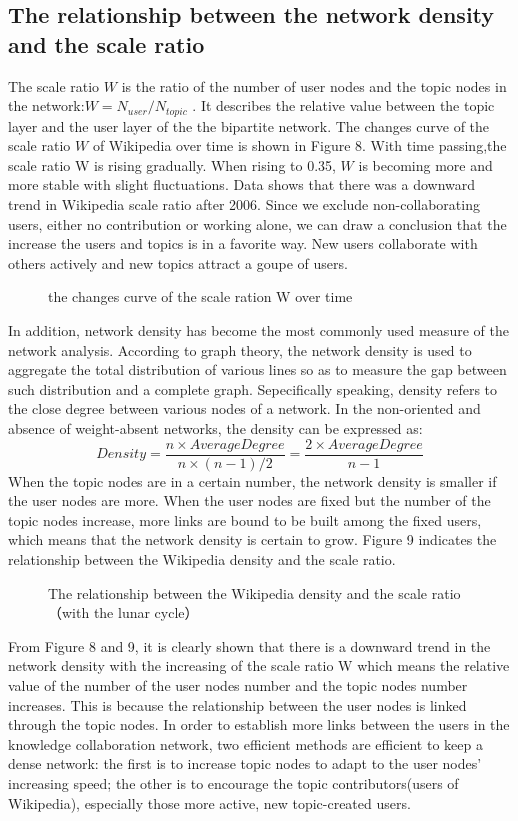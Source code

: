 \documentclass{elsarticle}
\begin{document}
\subsection{The relationship between the network density and the scale ratio}
\label{sec:relat-betw-netw}
 The scale
ratio $W$ is the ratio of the number of user nodes and the topic nodes in
the network:$W=N_{user}/N_{topic}$ . It describes the relative
value between the topic layer and the user layer of the the bipartite
network. The changes curve of the scale ratio $W$ of Wikipedia over time
is shown in Figure 8. With time passing,the scale ratio W is rising
gradually. When rising to 0.35, $W$ is becoming more and more stable
with slight fluctuations. Data shows that there was a downward trend in
Wikipedia scale ratio after 2006. Since we exclude non-collaborating
users, either no contribution or working alone, we can draw a
conclusion that the increase the users and topics is in a favorite
way. New users collaborate with others actively and new topics attract
a goupe of users.
\begin{figure}[htpb]
  \centering
  \scalebox{0.3}{\texttt{[image: 08]}}
  \caption{the changes curve of the scale ration W over time}
\end{figure}
In addition, network density has become the most commonly used measure
of the network analysis. According to graph theory, the network
density is used to aggregate the total distribution of various lines
so as to measure the gap between such distribution and a complete
graph. Sepecifically speaking, density refers to the close degree between various nodes of a network. In the non-oriented and absence of weight-absent  networks, the density can be expressed as:
\begin{equation}
  \label{eq:3}
  Density=\frac{n\times AverageDegree}{n\times(n-1)/2}=\frac{2\times AverageDegree}{n-1}
\end{equation}
When the topic nodes are in a certain number, the network density is
smaller if the user nodes are more. When the user nodes are fixed but the
number of the topic nodes increase, more links are bound to be built
among the fixed users, which means that the network density is certain
to grow. Figure 9 indicates the relationship between the Wikipedia density and the scale ratio. 
\begin{figure}[htpb]
  \centering
  \scalebox{0.3}{\texttt{[image: 09]}}
  \caption{The relationship between the Wikipedia density and the scale ratio （with the lunar cycle）}
\end{figure}
From Figure 8 and 9, it is clearly shown that there is a downward
trend in the network density with the increasing of the scale ratio W
which means the relative value of the number of the user nodes number
and the topic nodes number increases. This is because the relationship
between the user nodes is linked through the topic nodes.  In order to
establish more links between the users in the knowledge collaboration
network,  two efficient methods are efficient to keep a dense network:
the first is to increase topic nodes to adapt to the user nodes’
increasing speed; the other is to encourage the topic
contributors(users of Wikipedia), especially those more active, new topic-created users. 
\end{document}
